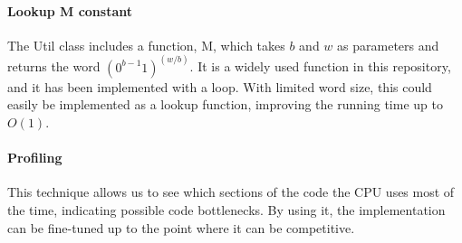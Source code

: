 \paragraph*{Lookup {\ttfamily M} constant}
The {\ttfamily Util} class includes a function, {\ttfamily M}, which takes $b$ and $w$ as parameters and returns the word $(0^{b-1}1)^{(w/b)}$. It is a widely used function in this repository, and it has been implemented with a loop. With limited word size, this could easily be implemented as a lookup function, improving the running time up to $O(1)$.

\paragraph*{Profiling}
This technique allows us to see which sections of the code the CPU uses most of the time, indicating possible code bottlenecks. By using it, the implementation can be fine-tuned up to the point where it can be competitive.